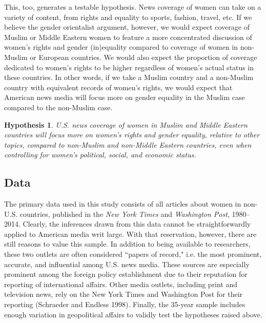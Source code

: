 \documentclass[11pt, oneside]{article}
\newtheorem{hypothesis}{Hypothesis}
\begin{document}
This, too, generates a testable hypothesis. News coverage of women can take on a variety of content, from rights and equality to sports, fashion, travel, etc. If we believe the gender orientalist argument, however, we would expect coverage of Muslim or Middle Eastern women to feature a more concentrated discussion of women's rights and gender (in)equality compared to coverage of women in non-Muslim or European countries. We would also expect the proportion of coverage dedicated to women's rights to be higher regardless of women's actual status in these countries. In other words, if we take a Muslim country and a non-Muslim country with equivalent records of women's rights, we would expect that American news media will focus more on gender equality in the Muslim case compared to the non-Muslim case.

\begin{hypothesis}
U.S. news coverage of women in Muslim and Middle Eastern countries will focus more on women's rights and gender equality, relative to other topics, compared to non-Muslim and non-Middle Eastern countries, even when controlling for women's political, social, and economic status.
\end{hypothesis}

\subsection{Data}

The primary data used in this study consists of all articles about women in non-U.S. countries, published in the \emph{New York Times} and \emph{Washington Post}, 1980--2014. Clearly, the inferences drawn from this data cannot be straightforwardly applied to American media writ large. With that reservation, however, there are still reasons to value this sample. In addition to being available to researchers, these two outlets are often considered ``papers of record," i.e. the most prominent, accurate, and influential among U.S. news media. These sources are especially prominent among the foreign policy establishment due to their reputation for reporting of international affairs. Other media outlets, including print and television news, rely on the New York Times and Washington Post for their reporting (Schraeder and Endless 1998).  Finally, the 35-year sample includes enough variation in geopolitical affairs to validly test the hypotheses raised above.
\end{document}
